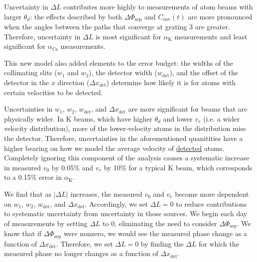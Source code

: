 \documentclass[twocolumn,prl,showpacs,superscriptaddress]{revtex4-1}   %
\newcommand{\ak}{\alpha_{\textrm{K}}}
\newcommand{\acs}{\alpha_{\textrm{Cs}}}
\newcommand{\dphisep}{\Delta\Phi_{\mathrm{sep}}}
\newcommand{\cenv}{C_{\mathrm{env}}}
\begin{document}
Uncertainty in $\Delta L$ contributes more highly to measurements of atom beams with larger $\theta_d$: the effects described by both $\dphisep$ and $\cenv(t)$ are more pronounced when the angles between the paths that converge at grating 3 are greater. Therefore, uncertainty in $\Delta L$ is most significant for $\ak$ measurements and least significant for $\acs$ measurements.

This new model also added elements to the error budget: the widths of the collimating slits ($w_1$ and $w_2$), the detector width ($w_{\mathrm{det}}$), and the offset of the detector in the $x$ direction ($\Delta x_{\mathrm{det}}$) determine how likely it is for atoms with certain velocities to be detected. 

Uncertainties in $w_1$, $w_2$, $w_{\mathrm{det}}$, and $\Delta x_{\mathrm{det}}$ are more significant for beams that are physically wider. 
In K beams, which have higher $\theta_d$ and lower $v_r$ (i.e. a wider velocity distribution), more of the lower-velocity atoms in the distribution miss the detector. Therefore, uncertainties in the aforementioned quanitities have a higher bearing on how we model the average velocity of \underline{detected} atoms.
Completely ignoring this component of the analysis causes a systematic increase in measured $v_0$ by 0.05\% and $v_r$ by 10\% for a typical K beam, which corresponds to a 0.15\% error in $\ak$.
 
We find that as $\left|\Delta L\right|$ increases, the measured $v_0$ and $v_r$ become more dependent on $w_1$, $w_2$, $w_{\mathrm{det}}$, and $\Delta x_{\mathrm{det}}$. Accordingly, we set $\Delta L = 0$ to reduce contributions to systematic uncertainty from uncertainty in those sources. We begin each day of measurements by setting $\Delta L$ to 0, eliminating the need to consider $\dphisep$. We know that if $\dphisep$ were nonzero, we would see the measured phase change as a function of $\Delta x_{\mathrm{det}}$. Therefore, we set $\Delta L = 0$ by finding the $\Delta L$ for which the measured phase no longer changes as a function of $\Delta x_{\mathrm{det}}$.
\end{document}

